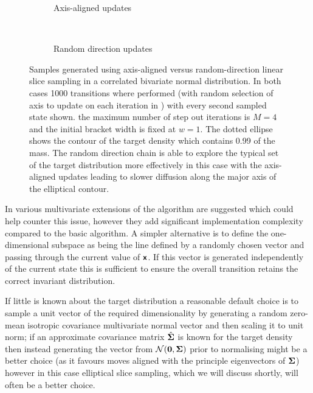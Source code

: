 \begin{figure}
\centering
\begin{subfigure}[b]{.46\linewidth}
\centering
  \vspace{-6mm}
  \caption{Axis-aligned updates}
  \label{sfig:axis-aligned-linear-slice-sampler}
\end{subfigure}
~~
\begin{subfigure}[b]{.46\linewidth}
\centering
  \vspace{-6mm}
  \caption{Random direction updates}
  \label{sfig:random-direction-linear-slice-sampler}
\end{subfigure}
  \caption[Linear slice sampler comparison.]{Samples generated using  axis-aligned versus  random-direction  linear slice sampling in a correlated bivariate normal distribution. In both cases 1000 transitions where performed (with random selection of axis to update on each iteration in ) with every second sampled state shown.  the maximum number of step out iterations is $M=4$ and the initial bracket width is fixed at $w=1$. The dotted ellipse shows the contour of the target density which contains 0.99 of the mass. The random direction chain is able to explore the typical set of the target distribution more effectively in this case with the axis-aligned updates leading to slower diffusion along the major axis of the elliptical contour.}
  \label{fig:linear-slice-sampler-comparison}
\end{figure}

In \citep{neal2003slice} various multivariate extensions of the algorithm are suggested which could help counter this issue, however they add significant implementation complexity compared to the basic algorithm. A simpler alternative is to define the one-dimensional subspace as being the line defined by a randomly chosen vector and passing through the current value of $\boldsymbol{\mathsf{x}}$. If this vector is generated independently of the current state this is sufficient to ensure the overall transition retains the correct invariant distribution. 

If little is known about the target distribution a reasonable default choice is to sample a unit vector of the required dimensionality by generating a random zero-mean isotropic covariance multivariate normal vector and then scaling it to unit norm; if an approximate covariance matrix $\hat{\boldsymbol{\Sigma}}$ is known for the target density then instead generating the vector from $\nrm{\vct{0},\mtx{\Sigma}}$ prior to normalising might be a better choice (as it favours moves aligned with the principle eigenvectors of $\boldsymbol{\Sigma}$) however in this case elliptical slice sampling, which we will discuss shortly, will often be a better choice. 


